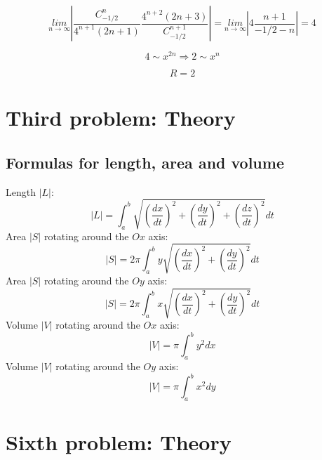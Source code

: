 \documentclass{article}
\begin{document}
\begin{equation*}
    \underset{n \rightarrow \infty}{lim} | \frac{C_{-1/2}^{n}}{4^{n+1}(2n+1)} \frac{4^{n+2}(2n+3)}{C_{-1/2}^{n+1}}| = \underset{n \rightarrow \infty}{lim} | 4 \frac{n+1}{-1/2-n} | = 4
\end{equation*}

\begin{equation*}
    4 \sim x^{2n} \Rightarrow 2 \sim x^n
\end{equation*}

\begin{equation}
    R = 2
\end{equation}


\newpage
\section{Third problem: Theory}

\hypertarget{3.1}{}
\subsection{Formulas for length, area and volume}
Length $|L|$:
\begin{equation*}
    |L| = \int_a^b \sqrt{(\frac{dx}{dt})^2+(\frac{dy}{dt})^2+(\frac{dz}{dt})^2}dt
\end{equation*}
Area $|S|$ rotating around the $Ox$ axis:
\begin{equation*}
    |S| = 2 \pi \int_a^b y \sqrt{(\frac{dx}{dt})^2+(\frac{dy}{dt})^2}dt
\end{equation*}
Area $|S|$ rotating around the $Oy$ axis:
\begin{equation*}
    |S| = 2 \pi \int_a^b x \sqrt{(\frac{dx}{dt})^2+(\frac{dy}{dt})^2}dt
\end{equation*}
Volume $|V|$ rotating around the $Ox$ axis:
\begin{equation*}
    |V| = \pi \int_a^b y^2 dx
\end{equation*}
Volume $|V|$ rotating around the $Oy$ axis:
\begin{equation*}
    |V| = \pi \int_a^b x^2 dy
\end{equation*}


\newpage
\section{Sixth problem: Theory}

\hypertarget{6.1}{}
\end{document}

